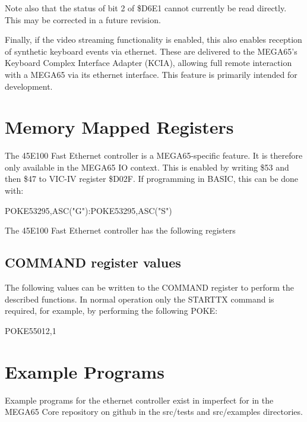 Note also that
the status of bit 2 of \$D6E1 cannot currently be read directly. This may be corrected in a future
revision.

Finally, if the video streaming functionality is enabled, this also enables reception of synthetic
keyboard events via ethernet.  These are delivered to the MEGA65's Keyboard Complex Interface Adapter
(KCIA), allowing full remote interaction with a MEGA65 via its ethernet interface.  This feature is
primarily intended for development.

\section{Memory Mapped Registers}

The 45E100 Fast Ethernet controller is a MEGA65-specific feature.
It is therefore only available in the MEGA65 IO context.
This is enabled by writing \$53 and then \$47 to VIC-IV register \$D02F.
If programming in BASIC, this can be done with:

\begin{screenoutput}
POKE53295,ASC("G"):POKE53295,ASC("S")
\end{screenoutput}

The 45E100 Fast Ethernet controller has the following registers



\subsection{COMMAND register values}

The following values can be written to the COMMAND register to perform the described functions.
In normal operation only the STARTTX command is required, for example, by performing the following POKE:

\begin{screenoutput}
POKE55012,1
\end{screenoutput}



\section{Example Programs}

Example programs for the ethernet controller exist in imperfect for in the MEGA65 Core repository on github in the src/tests and src/examples directories.
